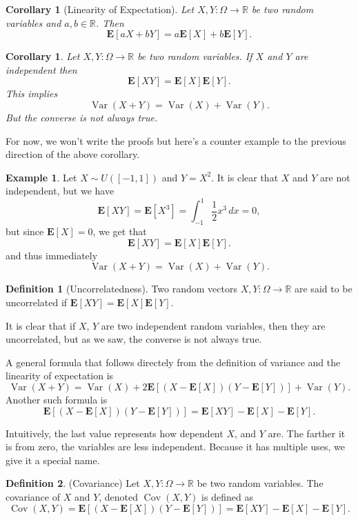 \documentclass[11pt,a4paper]{article}
\theoremstyle{definition}
\newtheorem{definition}{Definition}[section]
\newtheorem{example}{Example}[section]
\theoremstyle{plain}
\newtheorem{corollary}[theorem]{Corollary}
\DeclareMathOperator{\Var}{Var}
\DeclareMathOperator{\Cov}{Cov}
\newcommand{\R}{\mathbb{R}}
\newcommand{\E}{\mathbf{E}}
\begin{document}
  \begin{corollary}[Linearity of Expectation]
    Let $X,Y \colon \Omega \to \R$ be two random variables and $a,b \in \R$.
    Then
    \[
      \E[aX + bY] = a \E[X] + b \E[Y].
    \]
  \end{corollary}

  \begin{corollary}
    Let $X,Y \colon \Omega \to \R$ be two random variables.
    If $X$ and $Y$ are independent then
    \[
      \E[XY] = \E[X] \E[Y].
    \]
    This implies
    \[
      \Var(X + Y) = \Var(X) + \Var(Y).
    \]
    But the converse is not always true.
  \end{corollary}

  For now, we won't write the proofs but here's a counter example to
  the previous direction of the above corollary.

  \begin{example}
    Let $X \sim U([-1,1])$ and $Y = X^2$. It is clear that $X$ and $Y$
    are not independent, but we have
    \[
      \E[XY] =
      \E[X^3] =
      \int_{-1}^{1} \frac{1}{2} x^3\,dx =
      0,
    \]
    but since $\E[X] = 0$, we get that
    \[
      \E[XY] = \E[X] \E[Y].
    \]
    and thus immediately
    \[
      \Var(X + Y) = \Var(X) + \Var(Y).
    \]
  \end{example}

  \begin{definition}[Uncorrelatedness]
    Two random vectors $X,Y \colon \Omega \to \R$ are said to be
    uncorrelated if $\E[XY] = \E[X] \E[Y]$.
  \end{definition}

  It is clear that if $X$, $Y$ are two independent random variables, then
  they are uncorrelated, but as we saw, the converse is not always true.

  A general formula that follows directely from the definition of variance
  and the linearity of expectation is
  \[
    \Var(X + Y) =
    \Var(X) + 
    2 \E \left[ (X - \E[X])(Y - \E[Y]) \right] +
    \Var(Y).
  \]
  Another such formula is
  \[
    \E \left[(X - \E[X])(Y - \E[Y])\right] =
    \E[XY] - \E[X] - \E[Y].
  \]

  Intuitively, the last value represents how dependent $X$, and $Y$ are.
  The farther it is from zero, the variables are less independent.
  Because it has multiple uses, we give it a special name.

  \begin{definition}(Covariance)
    Let $X,Y \colon \Omega \to \R$ be two random variables.
    The covariance of $X$ and $Y$, denoted $\Cov(X,Y)$ is defined
    as
    \[
      \Cov(X,Y) =
      \E \left[(X - \E[X])(Y - \E[Y])\right] =
      \E[XY] - \E[X] - \E[Y].
    \]
  \end{definition}
  
\end{document}
